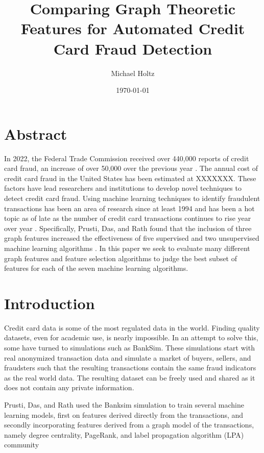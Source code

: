 \documentclass{article}
\title{Comparing Graph Theoretic Features for Automated Credit Card Fraud Detection}
\author{Michael Holtz}
\date{\today}
\begin{document}
\maketitle

\section{Abstract}
In 2022, the Federal Trade Commission received over 440,000 reports of credit card fraud, an increase of over 50,000 over the previous year \cite{ftc2021,ftc2022}. The annual cost of credit card fraud in the United States has been estimated at XXXXXXX. These factors have lead researchers and institutions to develop novel techniques to detect credit card fraud. Using machine learning techniques to identify fraudulent transactions has been an area of research since at least 1994 and has been a hot topic as of late as the number of credit card transactions continues to rise year over year \cite{1994, Federal_Reserve_2023}. Specifically, Prusti, Das, and Rath found that the inclusion of three graph features increased the effectiveness of five supervised and two unsupervised machine learning algorithms \cite{graphdb}. In this paper we seek to evaluate many different graph features and feature selection algorithms to judge the best subset of features for each of the seven machine learning algorithms. 
\section{Introduction}
Credit card data is some of the most regulated data in the world. Finding quality datasets, even for academic use, is nearly impossible. In an attempt to solve this, some have turned to simulations such as BankSim\cite{Banksim}. These simulations start with real anonymized transaction data and simulate a market of buyers, sellers, and fraudsters such that the resulting transactions contain the same fraud indicators as the real world data. The resulting dataset can be freely used and shared as it does not contain any private information. 

Prusti, Das, and Rath used the Banksim simulation to train several machine learning models, first on features derived directly from the transactions, and secondly incorporating features derived from a graph model of the transactions, namely degree centrality, PageRank, and label propagation algorithm (LPA) community



\end{document}
